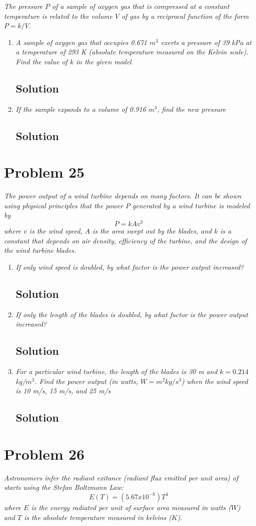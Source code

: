 \documentclass[11pt]{article}
\newcommand{\soln}{\subsection*}
\newcommand{\qn}{\textit}
\begin{document}
\qn{The pressure $P$ of a sample of oxygen gas that is compressed at a constant temperature is related to the volume $V$ of gas by a reciprocal function of the form $P=k/V$.}

\begin{enumerate}
	\item \qn{A sample of oxygen gas that occupies 0.671 $m^3$ exerts a pressure of 39 kPa at a temperature of 293 K (absolute temperature measured on the Kelvin scale). Find the value of $k$ in the given model}
	\soln{Solution}
	
	\item \qn{If the sample expands to a volume of 0.916 $m^3$, find the new pressure}
	\soln{Solution}
\end{enumerate}

\section*{Problem 25}

\qn{The power output of a wind turbine depends on many factors. It can be shown using physical principles that the power $P$ generated by a wind turbine is modeled by $$P=kAv^3$$ where $v$ is the wind speed, $A$ is the area swept out by the blades, and $k$ is a constant that depends on air density, efficiency of the turbine, and the design of the wind turbine blades.}

\begin{enumerate}
	\item \qn{If only wind speed is doubled, by what factor is the power output increased?}
	\soln{Solution}
	
	\item \qn{If only the length of the blades is doubled, by what factor is the power output increased?}
	\soln{Solution}
	
	\item \qn{For a particular wind turbine, the length of the blades is 30 m and $k=0.214$ kg/$m^3$. Find the power output (in watts, $W=m^2kg/s^3$) when the wind speed is 10 m/s, 15 m/s, and 25 m/s}
	\soln{Solution}
\end{enumerate}

\section*{Problem 26}

\qn{Astronomers infer the radiant exitance (radiant flux emitted per unit area) of starts using the Stefan Boltzmann Law: $$E(T)=(5.67 x 10^{-8})T^4$$ where $E$ is the energy radiated per unit of surface area measured in watts ($W$) and $T$ is the absolute temperature measured in kelvins ($K$).}
\end{document}
